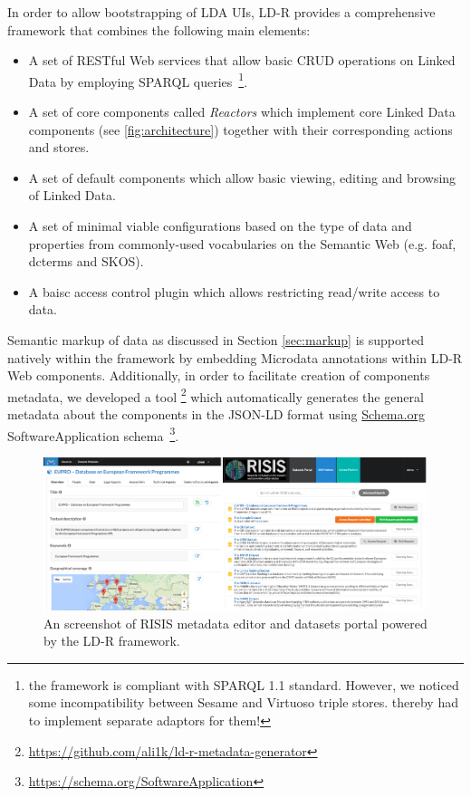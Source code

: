 \documentclass{acm_proc_article-sp}
\begin{document}
In order to allow bootstrapping of LDA UIs, LD-R provides a comprehensive framework that combines the following main elements:
\begin{itemize}

\item A set of RESTful Web services that allow basic CRUD operations on Linked Data by  employing SPARQL queries~\footnote{the framework is compliant with SPARQL 1.1 standard. However, we noticed some incompatibility between Sesame and Virtuoso triple stores. thereby had to implement separate adaptors for them!}.

\item A set of core components called \emph{Reactors} which implement core Linked Data components (see \autoref{fig:architecture}) together with their corresponding actions and stores.

\item A set of default components which allow basic viewing, editing and browsing of Linked Data.

\item A set of minimal viable configurations based on the type of data and properties from commonly-used vocabularies on the Semantic Web (e.g. foaf, dcterms and SKOS).

\item A baisc access control plugin which allows restricting read/write access to data.

\end{itemize}


Semantic markup of data as discussed in Section \ref{sec:markup} is supported natively within the framework by embedding Microdata annotations within LD-R Web components.
Additionally, in order to facilitate creation of components metadata, we developed a tool \footnote{\url{https://github.com/ali1k/ld-r-metadata-generator}} which automatically generates the general metadata about the components in the JSON-LD format using \url{Schema.org} SoftwareApplication schema~\footnote{\url{https://schema.org/SoftwareApplication}}.

\begin{figure}[ht] 
  \includegraphics[width=1\linewidth]{images/screenshots.jpg}
  \caption{An screenshot of RISIS metadata editor and datasets portal powered by the LD-R framework.}
  \label{fig:risisScreenshot}
\end{figure}
\end{document}
